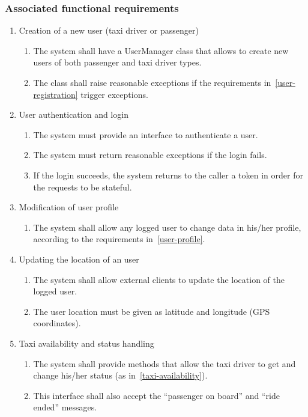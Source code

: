 \subsubsection{Associated functional requirements}
\begin{enumerate}
\item Creation of a new user (taxi driver or passenger)
\begin{enumerate}
    \item The system shall have a UserManager class that allows to create new users of both passenger and taxi driver types.
    \item The class shall raise reasonable exceptions if the requirements in~\autoref{user-registration} trigger exceptions.
\end{enumerate}
\item User authentication and login
\begin{enumerate}
    \item The system must provide an interface to authenticate a user.
    \item The system must return reasonable exceptions if the login fails.
    \item If the login succeeds, the system returns to the caller a token in order for the requests to be stateful.
\end{enumerate}
\item Modification of user profile
\begin{enumerate}
    \item The system shall allow any logged user to change data in his/her profile, according to the requirements in~\autoref{user-profile}.
\end{enumerate}
\item Updating the location of an user
\begin{enumerate}
    \item The system shall allow external clients to update the location of the logged user.
    \item The user location must be given as latitude and longitude (GPS coordinates).
\end{enumerate}
\item Taxi availability and status handling
\begin{enumerate}
    \item The system shall provide methods that allow the taxi driver to get and change his/her status (as in~\autoref{taxi-availability}).
    \item This interface shall also accept the ``passenger on board'' and ``ride ended'' messages.

\end{enumerate}
\end{enumerate}
